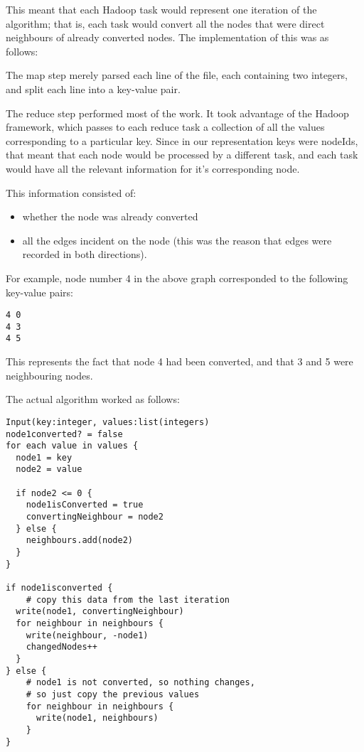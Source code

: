 This meant that each Hadoop task would represent one iteration of the algorithm; that is, each task would convert all the nodes that were direct neighbours of already converted nodes. The implementation of this was as follows:

The map step merely parsed each line of the file, each containing two integers, and split each line into a key-value pair.

The reduce step performed most of the work. It took advantage of the Hadoop framework, which passes to each reduce task a collection of all the values corresponding to a particular key. Since in our representation keys were nodeIds, that meant that each node would be processed by a different task, and each task would have all the relevant information for it's corresponding node.

This information consisted of:
\begin{itemize}
\item whether the node was already converted
\item all the edges incident on the node (this was the reason that edges were recorded in both directions).
\end{itemize}

For example, node number 4 in the above graph corresponded to the following key-value pairs:

\begin{verbatim}
4 0
4 3
4 5
\end{verbatim}

This represents the fact that node 4 had been converted, and that 3 and 5 were neighbouring nodes.

The actual algorithm worked as follows:

\begin{verbatim}
Input(key:integer, values:list(integers)
node1converted? = false
for each value in values {
  node1 = key
  node2 = value

  if node2 <= 0 {
    node1isConverted = true
    convertingNeighbour = node2
  } else {
    neighbours.add(node2)
  }
}

if node1isconverted {
	# copy this data from the last iteration
  write(node1, convertingNeighbour) 
  for neighbour in neighbours {
    write(neighbour, -node1)
    changedNodes++
  } 
} else {
    # node1 is not converted, so nothing changes, 
    # so just copy the previous values
    for neighbour in neighbours {
      write(node1, neighbours)
    }            
}
\end{verbatim}

